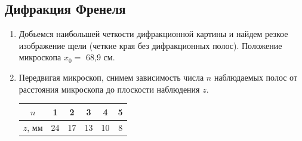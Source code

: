 \documentclass[a4paper, 12pt]{article}
\begin{document}
\subsection{Дифракция Френеля}

\begin{enumerate}
	\item Добьемся наибольшей четкости дифракционной картины и найдем резкое изображение щели (четкие края без дифракционных полос). Положение микроскопа $x_0 = $ 68,9 см.

	\item Передвигая микроскоп, снимем зависимость числа $n$ наблюдаемых полос от расстояния микроскопа до плоскости наблюдения $z$.
	\begin{center}
		\begin{tabular}{|c|c|c|c|c|c|}
			\hline
			$n$ & 1    & 2    & 3    & 4    & 5    \\ \hline
			$z$, мм & 24 & 17 & 13 & 10 & 8 \\ \hline
		\end{tabular}
	\end{center}


\end{enumerate}
\end{document}
